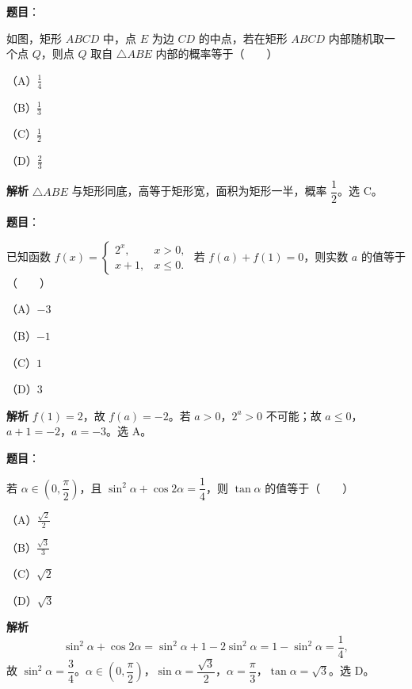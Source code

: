 \begin{answer}

\textbf{题目}：

如图，矩形 $ABCD$ 中，点 $E$ 为边 $CD$ 的中点，若在矩形 $ABCD$ 内部随机取一个点 $Q$，则点 $Q$ 取自 $\triangle ABE$ 内部的概率等于\mbox{（　　）}

（A）$\frac14$

（B）$\frac13$

（C）$\frac12$

（D）$\frac23$
\nopagebreak[4]
\begin{center}\end{center}
\nopagebreak[4]
\textbf{解析}
$\triangle ABE$ 与矩形同底，高等于矩形宽，面积为矩形一半，概率 $\dfrac12$。选 C。


\end{answer}
\begin{answer}

\textbf{题目}：

已知函数 $f(x)=\begin{cases}2^x,&x>0,\\x+1,&x\leqslant0.\end{cases}$ 若 $f(a)+f(1)=0$，则实数 $a$ 的值等于\mbox{（　　）}

（A）$-3$

（B）$-1$

（C）$1$

（D）$3$

\textbf{解析}
$f(1)=2$，故 $f(a)=-2$。若 $a>0$，$2^a>0$ 不可能；故 $a\leqslant0$，$a+1=-2$，$a=-3$。选 A。


\end{answer}
\begin{answer}

\textbf{题目}：

若 $\alpha\in\left(0,\dfrac\pi2\right)$，且 $\sin^2\alpha+\cos2\alpha=\dfrac14$，则 $\tan\alpha$ 的值等于\mbox{（　　）}

（A）$\frac{\sqrt2}2$

（B）$\frac{\sqrt3}3$

（C）$\sqrt2$

（D）$\sqrt3$

\textbf{解析}
\nopagebreak[4]
\[\sin^2\alpha+\cos2\alpha=\sin^2\alpha+1-2\sin^2\alpha=1-\sin^2\alpha=\frac14,\]
故 $\sin^2\alpha=\dfrac34$。$\alpha\in\left(0,\dfrac\pi2\right)$，$\sin\alpha=\dfrac{\sqrt3}2$，$\alpha=\dfrac\pi3$，$\tan\alpha=\sqrt3$。选 D。


\end{answer}
